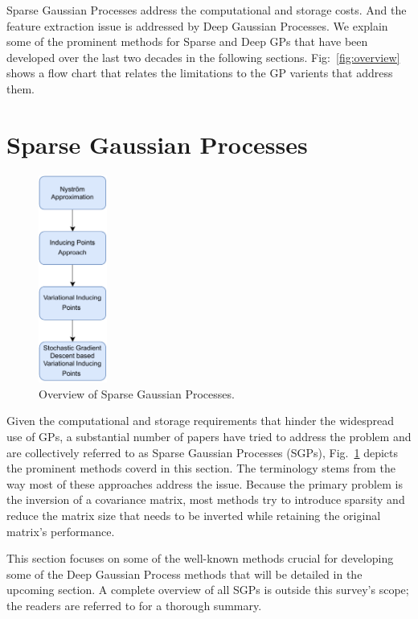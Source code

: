 \documentclass[letterpaper,11pt]{extarticle}
\begin{document}
Sparse Gaussian Processes address the computational and storage costs. And the feature extraction issue is addressed by Deep Gaussian Processes. We explain some of the prominent methods for Sparse and Deep GPs that have been developed over the last two decades in the following sections. Fig:~\ref{fig:overview} shows a flow chart that relates the limitations to the GP varients that address them.  

\section{Sparse Gaussian Processes}

\begin{figure}
  \begin{center}
    \includegraphics[width=0.2\textwidth]{figs/SGP.pdf}
  \end{center}
    \caption{Overview of Sparse Gaussian Processes.}
    \label{fig:sgp}
\end{figure}

Given the computational and storage requirements that hinder the widespread use of GPs, a substantial number of papers have tried to address the problem and are collectively referred to as Sparse Gaussian Processes (SGPs), Fig.~\ref{fig:sgp} depicts the prominent methods coverd in this section. The terminology stems from the way most of these approaches address the issue. Because the primary problem is the inversion of a covariance matrix, most methods try to introduce sparsity and reduce the matrix size that needs to be inverted while retaining the original matrix's performance. 

This section focuses on some of the well-known methods crucial for developing some of the Deep Gaussian Process methods that will be detailed in the upcoming section. A complete overview of all SGPs is outside this survey's scope; the readers are referred to \cite{LiuOSC20} for a thorough summary. 
\end{document}
